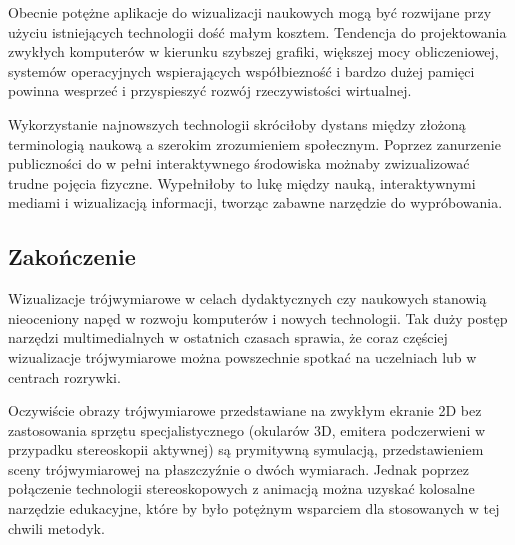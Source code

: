Obecnie potężne aplikacje do wizualizacji naukowych mogą być rozwijane przy użyciu istniejących technologii dość małym kosztem. Tendencja do projektowania zwykłych komputerów w kierunku szybszej grafiki, większej mocy obliczeniowej, systemów operacyjnych wspierających współbiezność i bardzo dużej pamięci powinna wesprzeć i przyspieszyć rozwój rzeczywistości wirtualnej.

Wykorzystanie najnowszych technologii skróciłoby dystans między złożoną terminologią naukową a szerokim zrozumieniem społecznym. Poprzez zanurzenie publiczności do w pełni interaktywnego środowiska możnaby zwizualizować trudne pojęcia fizyczne. Wypełniłoby to lukę między nauką, interaktywnymi mediami i wizualizacją informacji, tworząc zabawne narzędzie do wypróbowania.

\subsection{Zakończenie}
Wizualizacje trójwymiarowe w celach dydaktycznych czy naukowych stanowią nieoceniony napęd w rozwoju komputerów i nowych technologii.   Tak duży postęp narzędzi multimedialnych w ostatnich czasach sprawia, że coraz częściej wizualizacje trójwymiarowe można powszechnie spotkać na uczelniach lub w centrach rozrywki.

Oczywiście obrazy trójwymiarowe przedstawiane na zwykłym ekranie 2D bez zastosowania sprzętu specjalistycznego (okularów 3D, emitera podczerwieni w przypadku stereoskopii aktywnej) są prymitywną symulacją, przedstawieniem sceny trójwymiarowej na płaszczyźnie o dwóch wymiarach. Jednak poprzez połączenie technologii stereoskopowych z animacją można uzyskać kolosalne narzędzie edukacyjne, które by było potężnym wsparciem dla stosowanych w tej chwili metodyk. 

\newpage

\newpage
\listoffigures

\newpage
\listoftables



